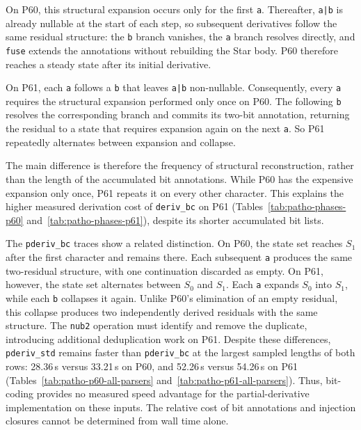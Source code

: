 On P60, this structural expansion occurs
only for the first \texttt{a}.
Thereafter, \texttt{a|b} is already nullable
at the start of each step, so subsequent
derivatives follow the same residual structure:
the \texttt{b} branch vanishes,
the \texttt{a} branch resolves directly,
and \texttt{fuse} extends the annotations
without rebuilding the Star body.
P60 therefore reaches a steady state after
its initial derivative.

On P61, each \texttt{a}
follows a \texttt{b} that leaves
\texttt{a|b} non-nullable.
Consequently, every \texttt{a} requires
the structural expansion performed only
once on P60.
The following \texttt{b} resolves the
corresponding branch and commits its
two-bit annotation, returning the residual
to a state that requires expansion again
on the next \texttt{a}.
So P61 repeatedly alternates between
expansion and collapse.

The main difference is therefore the frequency
of structural reconstruction, rather than
the length of the accumulated bit annotations.
While P60 has the expensive expansion only
once, P61 repeats it on every other character.
This explains the higher measured derivation
cost of \texttt{deriv\_bc} on P61
(Tables~\ref{tab:patho-phases-p60}
and~\ref{tab:patho-phases-p61}),
despite its shorter accumulated bit lists.

The \texttt{pderiv\_bc} traces show a
related distinction.
On P60, the state set reaches $S_1$
after the first character and remains there.
Each subsequent \texttt{a} produces the
same two-residual structure, with one
continuation discarded as empty.
On P61, however, the state set alternates
between $S_0$ and $S_1$.
Each \texttt{a} expands $S_0$ into $S_1$,
while each \texttt{b} collapses it again.
Unlike P60's elimination of an empty residual,
this collapse produces two independently
derived residuals with the same structure.
The \texttt{nub2} operation must identify
and remove the duplicate, introducing
additional deduplication work on P61.
Despite these differences,
\texttt{pderiv\_std} remains faster than
\texttt{pderiv\_bc} at the largest sampled
lengths of both rows:
28.36\,s versus 33.21\,s on P60,
and 52.26\,s versus 54.26\,s on P61
(Tables~\ref{tab:patho-p60-all-parsers}
and~\ref{tab:patho-p61-all-parsers}).
Thus, bit-coding provides no measured
speed advantage for the partial-derivative
implementation on these inputs.
The relative cost of bit annotations
and injection closures cannot be determined
from wall time alone.

%
%
%


